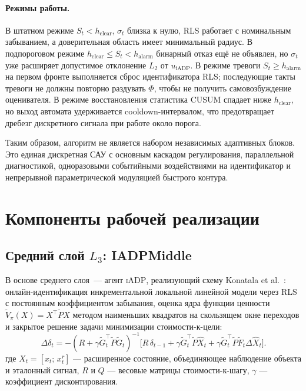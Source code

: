 \documentclass[a4paper,14pt]{extarticle}
\newcommand{\IADP}{\textsc{iADP}}
\newcommand{\CUSUM}{\textsc{CUSUM}}
\newcommand{\RLS}{\textsc{RLS}}
\begin{document}
\paragraph{Режимы работы.} В штатном режиме $S_t<h_{\text{clear}}$, $\sigma_t$ близка к нулю, \RLS{} работает с номинальным забыванием, а доверительная область имеет минимальный радиус. В подпороговом режиме $h_{\text{clear}}\leq S_t<h_{\text{alarm}}$ бинарный отказ ещё не объявлен, но $\sigma_t$ уже расширяет допустимое отклонение $L_2$ от $u_{\text{iADP}}$. В режиме тревоги $S_t\geq h_{\text{alarm}}$ на первом фронте выполняется сброс идентификатора \RLS{}; последующие такты тревоги не должны повторно раздувать $\Phi$, чтобы не получить самовозбуждение оценивателя. В режиме восстановления статистика \CUSUM{} спадает ниже $h_{\text{clear}}$, но выход автомата удерживается cooldown-интервалом, что предотвращает дребезг дискретного сигнала при работе около порога.

Таким образом, алгоритм не является набором независимых адаптивных блоков. Это единая дискретная САУ с основным каскадом регулирования, параллельной диагностикой, одноразовыми событийными воздействиями на идентификатор и непрерывной параметрической модуляцией быстрого контура.

\section{Компоненты рабочей реализации}
\label{sec:components}

\subsection{\texorpdfstring{Средний слой $L_3$: IADPMiddle}{Средний слой L3: IADPMiddle}}

В основе среднего слоя~--- агент \IADP{}, реализующий схему Konatala et al.~\cite{konatala2024}: онлайн-идентификация инкрементальной локальной линейной модели через \RLS{} с постоянным коэффициентом забывания, оценка ядра функции ценности $\tilde V_\pi(X) = X^\top \tilde P X$ методом наименьших квадратов на скользящем окне переходов и закрытое решение задачи минимизации стоимости-к-цели:
\begin{equation}
\Delta\delta_t = -(R + \gamma \tilde G_t^\top \tilde P \tilde G_t)^{-1}\bigl[R\,\delta_{t-1} + \gamma \tilde G_t^\top \tilde P \hat X_t + \gamma \tilde G_t^\top \tilde P \tilde F_t \Delta \hat X_t\bigr].
\label{eq:iadp-policy}
\end{equation}
где $X_t = [x_t;\,x_t^r]$ — расширенное состояние, объединяющее наблюдение объекта и эталонный сигнал, $R$ и $Q$ — весовые матрицы стоимости-к-шагу, $\gamma$ — коэффициент дисконтирования.
\end{document}
